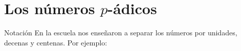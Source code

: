 \maketitle
  \section{Los números $p$-ádicos}
  \begin{frame}{Notación}
    En la escuela nos enseñaron a separar los números por unidades, decenas y centenas. Por ejemplo: 
  \end{frame}
